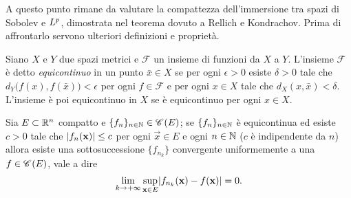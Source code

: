 A questo punto rimane da valutare la compattezza dell'immersione tra spazi di Sobolev e $\lclass[p]$, dimostrata nel teorema dovuto a Rellich e Kondrachov.
Prima di affrontarlo servono ulteriori definizioni e proprietà.
\begin{definizione} \label{d:equicontinuita}
    Siano $X$ e $Y$ due spazi metrici e $\mathcal{F}$ un insieme di funzioni da $X$ a $Y$.
    L'insieme $\mathcal{F}$ è detto \emph{equicontinuo} in un punto $\bar{x}\in X$ se per ogni $\epsilon>0$ esiste $\delta>0$ tale che $d_Y\bigl(f(x),f(\bar{x})\bigr)<\epsilon$ per ogni $f\in\mathcal{F}$ e per ogni $x\in X$ tale che $d_X(x,\bar{x})<\delta$.
    L'insieme è poi equicontinuo in $X$ se è equicontinuo per ogni $x\in X$.
\end{definizione}
\begin{teorema} \label{t:ascoli-arzela}
    Sia $E\subset\R^n$ compatto e $\{f_n\}_{n\in\N}\in\cont{E}$; se $\{f_n\}_{n\in\N}$ è equicontinua ed esiste $c>0$ tale che $\abs{f_n(\vec x)}\le c$ per ogni $\vec x\in E$ e ogni $n\in\N$ ($c$ è indipendente da $n$) allora esiste una sottosuccessione $\{f_{n_k}\}$ convergente uniformemente a una $f\in\cont{E}$, vale a dire
    \begin{equation}
        \lim_{k\to+\infty}\sup_{\vec x\in E}\abs{f_{n_k}(\vec x)-f(\vec x)}=0.
    \end{equation}
\end{teorema}
